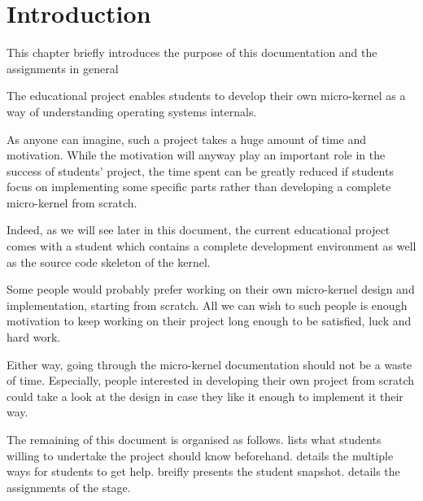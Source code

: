 %
%
%
%
%
%

%
%

\chapter{Introduction}
\label{chapter:introduction}

This chapter briefly introduces the purpose of this documentation
and the assignments in general

\newpage

%
%

The  educational project enables students to develop their own
micro-kernel as a way of understanding operating systems internals.

As anyone can imagine, such a project takes a huge amount of time and
motivation. While the motivation will anyway play an important role in the
success of students' project, the time spent can be greatly reduced if
students focus on implementing some specific parts rather than developing a
complete micro-kernel from scratch.

Indeed, as we will see later in this document, the current 
educational project comes with a student  which contains
a complete development environment as well as the source code skeleton of
the kernel.

Some people would probably prefer working on their own micro-kernel design
and implementation, starting from scratch. All we can wish to such people
is enough motivation to keep working on their project long enough to be
satisfied, luck and hard work.

Either way, going through the  micro-kernel documentation
should not be a waste of time. Especially, people interested in developing
their own project from scratch could take a look at the  design
in case they like it enough to implement it their way.

The remaining of this document is organised as follows.  lists what students willing to undertake the
project should know beforehand. 
details the multiple ways for students to get help.  breifly presents the student snapshot.
 details the assignments of the stage.
